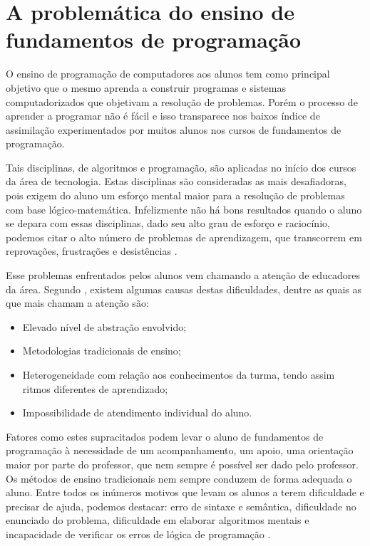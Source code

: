 \documentclass[pnumabnt,normaltoc,espacoumemeio,capchap]{abnt}
\begin{document}
\section{A problemática do ensino de fundamentos de programação}
\par O ensino de programação de computadores aos alunos tem como principal objetivo que o mesmo aprenda a construir programas e sistemas computadorizados que objetivam a resolução de problemas. Porém o processo de aprender a programar não é fácil e isso transparece nos baixos índice de assimilação experimentados por muitos alunos nos cursos de fundamentos de programação.
\par Tais disciplinas, de algoritmos e programação, são aplicadas no início dos cursos da área de tecnologia. Estas disciplinas são consideradas as mais desafiadoras, pois exigem do aluno um esforço mental maior para a resolução de problemas com base lógico-matemática. Infelizmente não há bons resultados quando o aluno se depara com essas disciplinas, dado seu alto grau de esforço e raciocínio, podemos citar o alto número de problemas de aprendizagem, que transcorrem em reprovações, frustrações e desistências \cite{DE08}.
\par Esse problemas enfrentados pelos alunos vem chamando a atenção de educadores da área. Segundo , existem algumas causas destas dificuldades, dentre as quais as que mais chamam a atenção são:
\begin{itemize}
	\item Elevado nível de abstração envolvido;
	\item Metodologias tradicionais de ensino;
	\item Heterogeneidade com relação aos conhecimentos da turma, tendo assim ritmos diferentes de aprendizado;
	\item Impossibilidade de atendimento individual do aluno. 
\end{itemize}
\par Fatores como estes supracitados podem levar o aluno de fundamentos de programação à necessidade de um acompanhamento, um apoio, uma orientação maior por parte do professor, que nem sempre é possível ser dado pelo professor. Os métodos de ensino tradicionais nem sempre conduzem de forma adequada o aluno. Entre todos os inúmeros motivos que levam os alunos a terem dificuldade e precisar de ajuda, podemos destacar: erro de sintaxe e semântica, dificuldade no enunciado do problema, dificuldade em elaborar algoritmos mentais e incapacidade de verificar os erros de lógica de programação \cite{GM00}.
\end{document}
